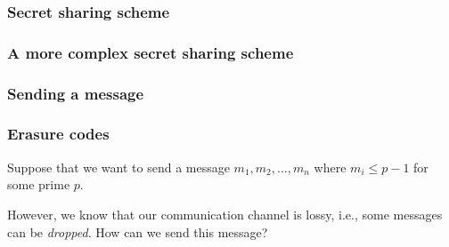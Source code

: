 \begin{frame}
  \frametitle{Secret sharing scheme}
\end{frame}

\begin{frame}
  \frametitle{A more complex secret sharing scheme}
\end{frame}

\begin{frame}
  \frametitle{Sending a message}
\end{frame}

\begin{frame}
  \frametitle{Erasure codes}

  Suppose that we want to send a message $m_1,m_2,\ldots,m_n$ where
  $m_i\leq p-1$ for some prime $p$. 

  However, we know that our communication channel is lossy, i.e., some
  messages can be {\em dropped}.  How can we send this message?

  \vspace{2.5in}
\end{frame}
